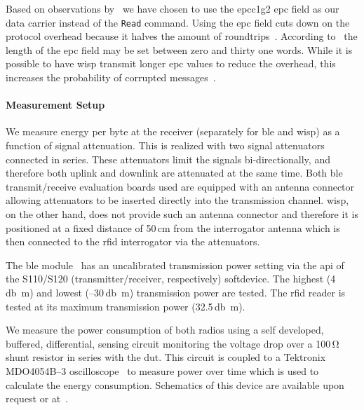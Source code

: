\documentclass[conference,letterpaper,twoside,final,10pt]{IEEEtran}
\begin{document}
Based on observations by~\cite[Sec. 4.1]{gummeson2012flit} we have chosen to use the \ac{epcc1g2} \ac{epc} field as our data carrier instead of the \texttt{Read} command.
Using the \ac{epc} field cuts down on the protocol overhead because it halves the amount of roundtrips~\cite[Sec. 6.3.2.12.3]{epcglobal2013gen2}.
According to~\cite[Sec. 6.3.2.1.2.2]{epcglobal2013gen2} the length of the \ac{epc} field may be set between zero and thirty one words.
While it is possible to have \ac{wisp} transmit longer \ac{epc} values to reduce the overhead, this increases the probability of corrupted messages~\cite{lettieri1998info}. 

\paragraph{Measurement Setup}
\label{sec:motivation/method}

We measure energy per byte at the receiver (separately for \ac{ble} and \ac{wisp}) as a function of signal attenuation.
This is realized with two signal attenuators~\cite{jfw2015attenuators} connected in series.
These attenuators limit the signals bi-directionally, and therefore both uplink and downlink are attenuated at the same time.
Both \ac{ble} transmit/receive evaluation boards used are equipped with an antenna connector allowing attenuators to be inserted directly into the transmission channel.
\ac{wisp}, on the other hand, does not provide such an antenna connector and therefore it is positioned at a fixed distance of 50\,\si{\centi\metre} from the interrogator antenna which is then connected to the \ac{rfid} interrogator via the attenuators.

The \ac{ble} module~\cite{nordic2012nrf51822} has an uncalibrated transmission power setting via the \acs{api} of the S110/S120 (transmitter/receiver, respectively) softdevice.
The highest (4\,\si{\decibel m}) and lowest (--30\,\si{\decibel m}) transmission power are tested.
The \ac{rfid} reader is tested at its maximum transmission power (32.5\,\si{\decibel m}).

We measure the power consumption of both radios using a self developed, buffered, differential, sensing circuit monitoring the voltage drop over a 100\,\si{\ohm} shunt resistor in series with the \ac{dut}.
This circuit is coupled to a Tektronix MDO4054B\mbox{--}3 oscilloscope~\cite{tektronix2015mdo4000} to measure power over time which is used to calculate the energy consumption.
Schematics of this device are available upon request or at~\cite{blisp2015repo}.
\end{document}
